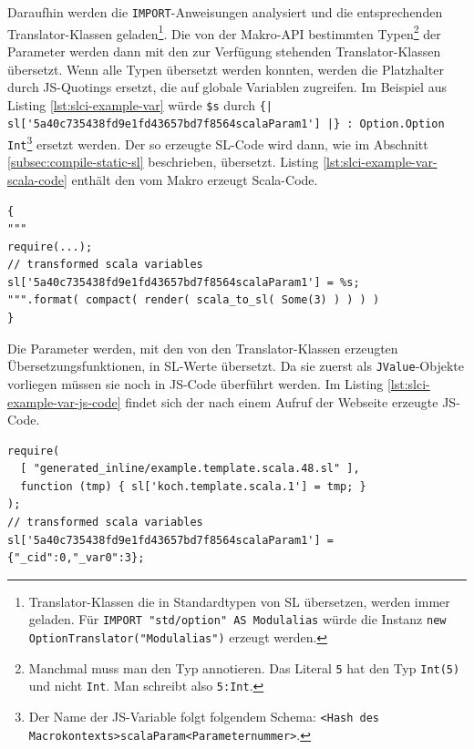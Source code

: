\documentclass[12pt,bibtotoc]{scrreprt}
\begin{document}
Daraufhin werden die \lstinline!IMPORT!-Anweisungen analysiert und die entsprechenden Translator-Klassen geladen\footnote{Translator-Klassen die in Standardtypen von SL übersetzen, werden immer geladen. Für \lstinline!IMPORT "std/option" AS Modulalias! würde die Instanz \lstinline!new OptionTranslator("Modulalias")! erzeugt werden.}. Die von der Makro-API bestimmten Typen\footnote{Manchmal muss man den Typ annotieren. Das Literal \lstinline!5! hat den Typ \lstinline!Int(5)! und nicht \lstinline!Int!. Man schreibt also \lstinline!5:Int!.} der Parameter werden dann mit den zur Verfügung stehenden Translator-Klassen übersetzt. 
Wenn alle Typen übersetzt werden konnten, werden die Platzhalter durch \ac{JS}-Quotings ersetzt, die auf globale Variablen zugreifen. Im Beispiel aus Listing \ref{lst:slci-example-var} würde \lstinline!$s! durch \lstinline!{| sl['5a40c735438fd9e1fd43657bd7f8564scalaParam1'] |} : Option.Option Int!\footnote{Der Name der JS-Variable folgt folgendem Schema: \lstinline!<Hash des Macrokontexts>scalaParam<Parameternummer>!.} ersetzt werden. Der so erzeugte SL-Code wird dann, wie im Abschnitt \ref{subsec:compile-static-sl} beschrieben, übersetzt. 
Listing \ref{lst:slci-example-var-scala-code} enthält den vom Makro erzeugt Scala-Code. 

\begin{lstlisting}[caption={Erzeugter Scala-Code zum Listing \ref{lst:slci-example-var}}, label=lst:slci-example-var-scala-code, float=h]
{ 
"""
require(...);
// transformed scala variables    
sl['5a40c735438fd9e1fd43657bd7f8564scalaParam1'] = %s;
""".format( compact( render( scala_to_sl( Some(3) ) ) ) )
}
\end{lstlisting}

Die Parameter werden, mit den von den Translator-Klassen erzeugten Übersetzungsfunktionen, in \ac{SL}-Werte übersetzt. Da sie zuerst als \lstinline!JValue!-Objekte vorliegen müssen sie noch in \ac{JS}-Code überführt werden. Im Listing \ref{lst:slci-example-var-js-code} findet sich der nach einem Aufruf der Webseite erzeugte \ac{JS}-Code.

\begin{lstlisting}[caption={JS-Code zum Listing \ref{lst:slci-example-var}}, label=lst:slci-example-var-js-code, float=h]
require( 
  [ "generated_inline/example.template.scala.48.sl" ],
  function (tmp) { sl['koch.template.scala.1'] = tmp; }
);
// transformed scala variables 
sl['5a40c735438fd9e1fd43657bd7f8564scalaParam1'] = {"_cid":0,"_var0":3};
\end{lstlisting}
\end{document}
